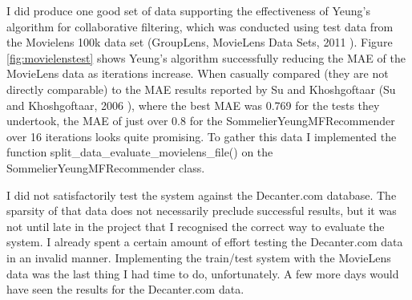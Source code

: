 I did produce one good set of data supporting the effectiveness of Yeung's algorithm for collaborative filtering, which was conducted using test data from the Movielens 100k data set (GroupLens, MovieLens Data Sets, 2011 \cite{MovielensDatasets}). Figure \ref{fig:movielenstest} shows Yeung's algorithm successfully reducing the MAE of the MovieLens data as iterations increase. When casually compared (they are not directly comparable) to the MAE results reported by Su and Khoshgoftaar (Su and Khoshgoftaar, 2006 \cite{Su06}), where the best MAE was 0.769 for the tests they undertook, the MAE of just over 0.8 for the SommelierYeungMFRecommender over 16 iterations looks quite promising. To gather this data I implemented the function split\_data\_evaluate\_movielens\_file() on the SommelierYeungMFRecommender class.

I did not satisfactorily test the system against the Decanter.com database. The sparsity of that data does not necessarily preclude successful results, but it was not until late in the project that I recognised the correct way to evaluate the system. I already spent a certain amount of effort testing the Decanter.com data in an invalid manner. Implementing the train/test system with the MovieLens data was the last thing I had time to do, unfortunately. A few more days would have seen the results for the Decanter.com data.

